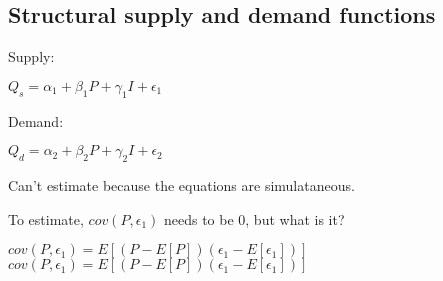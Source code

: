 
\subsection{Structural supply and demand functions}

Supply:

\(Q_s=\alpha_1 + \beta_1P+\gamma_1I + \epsilon_1\)

Demand:

\(Q_d=\alpha_2 + \beta_2P+\gamma_2I + \epsilon_2\)

Can't estimate because the equations are simulataneous.


To estimate, \(cov(P, \epsilon_1)\) needs to be \(0\), but what is it?

\(cov(P, \epsilon_1)= E[(P-E[P])(\epsilon_1-E[\epsilon_1])]\)
\(cov(P, \epsilon_1)= E[(P-E[P])(\epsilon_1-E[\epsilon_1])]\)

